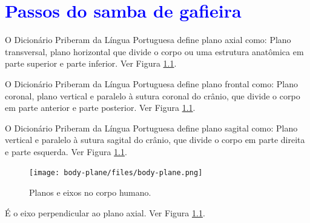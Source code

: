 

\chapter{\textcolor{blue}{Passos do samba de gafieira}}

\begin{definition} 
\label{def:PlanoAxial}
O Dicionário Priberam da Língua Portuguesa \cite{priberamplano} define plano axial como:
Plano transversal, plano horizontal que divide o corpo ou uma estrutura anatômica em parte superior e parte inferior.
Ver Figura \ref{fig:bodyhumanplane}.
\end{definition}

\begin{definition} 
\label{def:PlanoFrontal}
O Dicionário Priberam da Língua Portuguesa \cite{priberamplano} define plano frontal como:
Plano coronal,   plano vertical e paralelo à sutura coronal do crânio, que divide o corpo em parte anterior e parte posterior.
Ver Figura \ref{fig:bodyhumanplane}.
\end{definition}

\begin{definition} 
\label{def:PlanoSagital}
O Dicionário Priberam da Língua Portuguesa \cite{priberamplano} define plano sagital como:
Plano vertical e paralelo à sutura sagital do crânio, que divide o corpo em parte direita e parte esquerda.
Ver Figura \ref{fig:bodyhumanplane}.
\end{definition}

\begin{figure}[h!]
  \centering
    \texttt{[image: body-plane/files/body-plane.png]}
  \caption{ Planos e eixos no corpo humano.}
\label{fig:bodyhumanplane}
\end{figure}

\begin{definition} 
\label{def:EixoAxial}
É o eixo perpendicular ao plano axial.
Ver Figura \ref{fig:bodyhumanplane}.
\end{definition}

